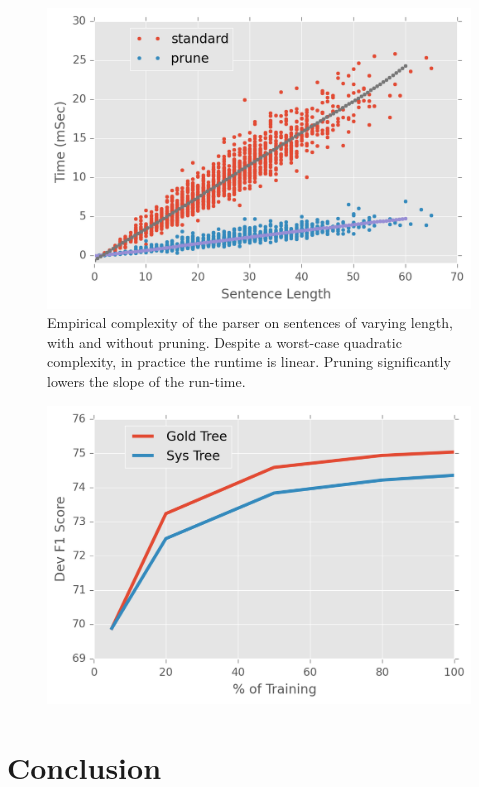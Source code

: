 \documentclass[11pt,letterpaper]{article}
\begin{document}
\begin{figure}
  \centering
  \includegraphics[scale=0.5]{../notebooks/comp}
  \caption{Empirical complexity of the parser on sentences of varying length, with and without pruning. 
  Despite a worst-case quadratic complexity, in practice the runtime is linear. Pruning significantly lowers
  the slope of the run-time.}
\label{fig:speed}
\end{figure}


\begin{figure}
  \centering
  \includegraphics[scale=0.5]{../notebooks/data}
\label{fig:dataamo}
\end{figure}



\section{Conclusion}
\end{document}
